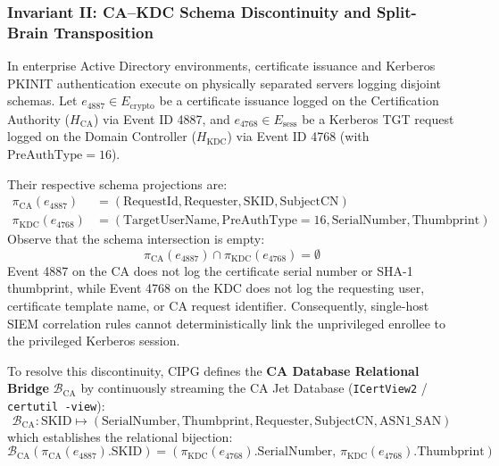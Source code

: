 \subsubsection{Invariant II: CA--KDC Schema Discontinuity and Split-Brain Transposition}
\label{sec:schema_discontinuity_math}
In enterprise Active Directory environments, certificate issuance and Kerberos PKINIT authentication execute on physically separated servers logging disjoint schemas. Let $e_{4887} \in E_{\text{crypto}}$ be a certificate issuance logged on the Certification Authority ($H_{\text{CA}}$) via Event ID 4887, and $e_{4768} \in E_{\text{sess}}$ be a Kerberos TGT request logged on the Domain Controller ($H_{\text{KDC}}$) via Event ID 4768 (with $\text{PreAuthType} = 16$).

Their respective schema projections are:
\begin{align}
\pi_{\text{CA}}(e_{4887}) &= (\text{RequestId}, \text{Requester}, \text{SKID}, \text{SubjectCN}) \\
\pi_{\text{KDC}}(e_{4768}) &= (\text{TargetUserName}, \text{PreAuthType}=16, \text{SerialNumber}, \text{Thumbprint})
\end{align}
Observe that the schema intersection is empty:
\begin{equation}
\pi_{\text{CA}}(e_{4887}) \cap \pi_{\text{KDC}}(e_{4768}) = \emptyset
\end{equation}
Event 4887 on the CA does not log the certificate serial number or SHA-1 thumbprint, while Event 4768 on the KDC does not log the requesting user, certificate template name, or CA request identifier. Consequently, single-host SIEM correlation rules cannot deterministically link the unprivileged enrollee to the privileged Kerberos session.

To resolve this discontinuity, CIPG defines the \textbf{CA Database Relational Bridge} $\mathcal{B}_{\text{CA}}$ by continuously streaming the CA Jet Database (\texttt{ICertView2} / \texttt{certutil -view}):
\begin{equation}
\mathcal{B}_{\text{CA}}: \text{SKID} \mapsto (\text{SerialNumber}, \text{Thumbprint}, \text{Requester}, \text{SubjectCN}, \text{ASN1\_SAN})
\end{equation}
which establishes the relational bijection:
\begin{equation}
\mathcal{B}_{\text{CA}}(\pi_{\text{CA}}(e_{4887}).\text{SKID}) = (\pi_{\text{KDC}}(e_{4768}).\text{SerialNumber}, \, \pi_{\text{KDC}}(e_{4768}).\text{Thumbprint})
\end{equation}

